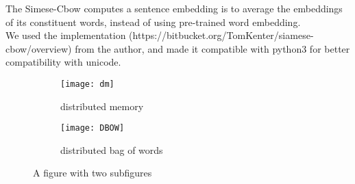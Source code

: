 	The Simese-Cbow\cite{kenter2016siamesecbow} computes a sentence embedding is to average the embeddings of its
constituent words, instead of using pre-trained word embedding. \\

	We used the implementation (https://bitbucket.org/TomKenter/siamese-cbow/overview) from the author, and made it compatible with python3 for better compatibility with unicode.


\begin{figure}
\centering
\begin{subfigure}{.5\textwidth}
  \centering
  \texttt{[image: dm]}
  \caption{distributed memory}
  \label{fig:sub1}
\end{subfigure}%
\begin{subfigure}{.5\textwidth}
  \centering
  \texttt{[image: DBOW]}
  \caption{distributed bag of words}
  \label{fig:sub2}
\end{subfigure}
\caption{A figure with two subfigures}
\label{fig:test}
\end{figure}

